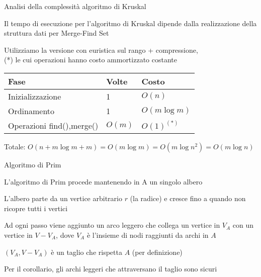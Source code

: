 \begin{frame}{Analisi della complessità algoritmo di Kruskal}

\BIL
\item Il tempo di esecuzione per l’algoritmo di Kruskal dipende dalla realizzazione della struttura dati per Merge-Find Set
\item Utilizziamo la versione con \alert{euristica sul rango + compressione},\\ (*) le cui operazioni hanno costo ammortizzato costante 

\medskip
\begin{tabular}{|l|l|l|}
\hline
\textbf{Fase} & \textbf{Volte} & \textbf{Costo} \\\hline
Inizializzazione & 1 & $O(n)$ \\\hline
Ordinamento & 1 & $O(m \log m)$ \\\hline
Operazioni \textsf{find}(),\textsf{merge}() & $O(m)$ & $O(1)^{(*)}$ \\\hline
\end{tabular}
\item Totale:  $O(n + m \log m + m) = O(m \log m) = O(m \log n^2) = O(m \log n)$
\EIL
\end{frame}

\begin{frame}{Algoritmo di Prim}


\vspace{-9pt}
\begin{myboxtitle}[Idea]
\BIL
\item L’algoritmo di Prim procede mantenendo in A un singolo albero 
\item L’albero parte da un vertice arbitrario $r$ (la radice) e cresce fino a quando non ricopre tutti i vertici
\item Ad ogni passo viene aggiunto un arco leggero che collega un vertice in $V_A$ con un vertice in $V-V_A$,
dove $V_A$ è l'insieme di nodi raggiunti da archi in $A$
\EIL
\end{myboxtitle}

\begin{myboxtitle}[Correttezza]
\BIL
\item $(V_A,V-V_A)$ è un taglio che rispetta $A$ (per definizione)
\item Per il corollario, gli archi leggeri che attraversano il taglio sono sicuri
\EIL
\end{myboxtitle}

\end{frame}

